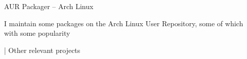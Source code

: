 \begin{cventries}
  \cventry
    {AUR Packager --
    \href{https://aur.archlinux.org/packages/?SeB=m&K=ljmf00}{\faLink\acvHeaderIconSep\@Packages}} %
    {Arch Linux} %
    {} %
    {} %
    {
      \begin{cvitems} %
        \item {I maintain some packages on the Arch Linux User Repository, some of which with some popularity}
      \end{cvitems}
    }

  \cventry
    {\href{https://github.com/pulls?q=is\%3Apr+author\%3Aljmf00+archived\%3Afalse+is\%3Aclosed}{\faGithubSquare\acvHeaderIconSep\@Contributions} | \href{https://www.lsferreira.net/projects/}{\faLink\acvHeaderIconSep\@Projects}} %
    {Other relevant projects} %
    {} %
    {} %
    {}

\end{cventries}

